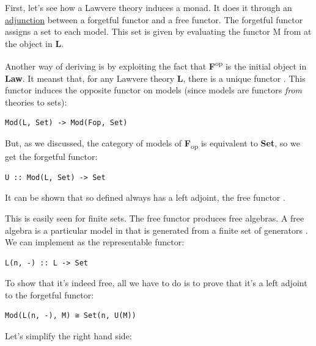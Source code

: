First, let's see how a Lawvere theory induces a monad. It does it
through an
\href{https://bartoszmilewski.com/2016/06/15/freeforgetful-adjunctions/}{adjunction}
between a forgetful functor and a free functor. The forgetful functor
 assigns a set to each model. This set is given by evaluating
the functor M from  at the object  in
\textbf{L}.

Another way of deriving  is by exploiting the fact that
\textbf{F}\textsuperscript{op} is the initial object in \textbf{Law}. It
meanst that, for any Lawvere theory \textbf{L}, there is a unique
functor . This functor induces the
opposite functor on models (since models are functors \emph{from}
theories to sets):

\begin{Verbatim}[commandchars=\\\{\}]
Mod(L, Set) -> Mod(Fop, Set)
\end{Verbatim}

But, as we discussed, the category of models of
\textbf{F}\textsubscript{op} is equivalent to \textbf{Set}, so we get
the forgetful functor:

\begin{Verbatim}[commandchars=\\\{\}]
U :: Mod(L, Set) -> Set
\end{Verbatim}

It can be shown that so defined  always has a left adjoint,
the free functor .

This is easily seen for finite sets. The free functor 
produces free algebras. A free algebra is a particular model in
 that is generated from a finite set of generators
. We can implement  as the representable functor:

\begin{Verbatim}[commandchars=\\\{\}]
L(n, -) :: L -> Set
\end{Verbatim}

To show that it's indeed free, all we have to do is to prove that it's a
left adjoint to the forgetful functor:

\begin{Verbatim}[commandchars=\\\{\}]
Mod(L(n, -), M) ≅ Set(n, U(M))
\end{Verbatim}

Let's simplify the right hand side:

